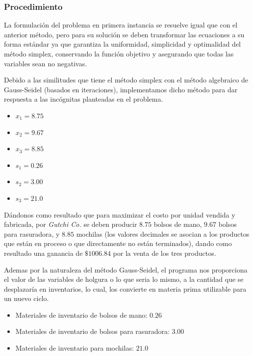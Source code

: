 \documentclass[conference]{IEEEtran}
\begin{document}
\subsubsection*{Procedimiento}

La formulación del problema en primera instancia se resuelve igual
que con el anterior método, pero para su solución se deben transformar
las ecuaciones a su forma estándar ya que garantiza la uniformidad,
simplicidad y optimalidad del método simplex, conservando la función
objetivo y asegurando que todas las variables sean no negativas.

Debido a las similitudes que tiene el método simplex con el método
algebraico de Gauss-Seidel (basados en iteraciones), implementamos dicho
método para dar respuesta a las incógnitas planteadas en el problema.

\begin{itemize}
    \item $x_{1} = 8.75$
    \item $x_{2} = 9.67$
    \item $x_{3} = 8.85$
    \item $s_{1} = 0.26$
    \item $s_{2} = 3.00$
    \item $s_{3} = 21.0$
\end{itemize}

Dándonos como resultado que para maximizar el costo por unidad vendida y
fabricada, por \textit{Gutchi Co.} se deben producir $8.75$ bolsos de mano,
$9.67$ bolsos para rasuradora, y $8.85$ mochilas (los valores decimales
se asocian a los productos que están en proceso o que directamente
no están terminados), dando como resultado una ganancia de $\$1006.84$ por
la venta de los tres productos.

Ademas por la naturaleza del método Gauss-Seidel, el programa nos proporciona
el valor de las variables de holgura o lo que seria lo mismo, a la cantidad
que se desplazaría en inventarios, lo cual, los convierte en materia
prima utilizable para un nuevo ciclo.

\begin{itemize}
    \item Materiales de inventario de bolsos de mano: $0.26$
    \item Materiales de inventario de bolsos para rasuradora: $3.00$
    \item Materiales de inventario para mochilas: $21.0$
\end{itemize}


\end{document}
